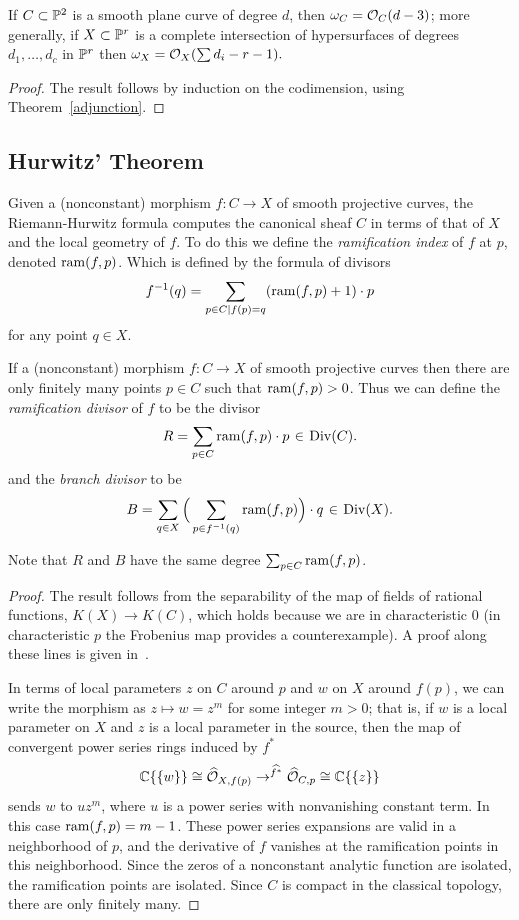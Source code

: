 \begin{corollary}\label{canonical of plane curve}
If $C\subset {\mathbb P}^{2}$ is a smooth plane curve of degree $d$, then $\omega_{C} = {\mathcal O}_{C}(d-3)$; more generally, if
$X\subset {\mathbb P}^{r}$ is a complete intersection of hypersurfaces of degrees $d_{1},\dots, d_{c}$ in ${\mathbb P}^r$ then
$\omega_{X} = {\mathcal O}_{X}(\sum d_{i }-r-1).$
\end{corollary}

\begin{proof}
The result follows by induction on the codimension, using Theorem~\ref{adjunction}.
\end{proof}

\subsection{Hurwitz' Theorem}
 Given a (nonconstant) morphism $f : C \to X$ of smooth projective curves, the Riemann-Hurwitz formula computes the canonical sheaf  $C$ in terms of that of  $X$ and the local geometry of $f$. To do this we define the
\emph{ramification index} of $f$ at $p$,  denoted $\operatorname{ram}(f,p)$. 
Which is defined 
by the formula of divisors
$$
 f^{-1}(q) = \sum_{p\in C \mid f(p)=q} (\operatorname{ram}(f,p)+1)\cdot p
 $$
 for any point $q \in X$.

\begin{proposition}
If a (nonconstant) morphism $f : C \to X$ of smooth projective curves then there are only finitely many
points $p\in C$ such that $\operatorname{ram}(f,p)>0$.
Thus we can define the \emph{ramification divisor} of $f$ to be the divisor
 $$
 R = \sum_{p \in C} \ram(f,p)\cdot p \; \in \;  \Div(C).
 $$
 and the \emph{branch divisor} to be
 $$
 B = \sum_{q \in X} \Big(\sum_{p \in f^{-1}(q)} \ram(f,p) \Big)\cdot q \; \in \; \Div(X).
 $$
\end{proposition}

Note that $R$ and $B$ have the same degree $\sum_{p \in C} \operatorname{ram}(f,p)$.

\begin{proof}
The result follows from the separability of the map of fields of rational functions, $K(X) \to K(C)$, which holds because we
are in characteristic 0 (in characteristic $p$ the Frobenius map provides a counterexample). A proof along these lines
is given in~\cite[Section IV.2]{Hartshorne1977}.

In terms of local parameters $z$ on $C$ around $p$ and $w$ on $X$ around $f(p)$, we can write the morphism as $z \mapsto w = z^m$ for some integer $m > 0$; that is,
if $w$ is a local parameter on $X$ and $z$ is a local parameter in the source, then
the map of convergent power series rings induced by $f^*$
$$
 {\mathbb C}\{\{w\}\} \cong \widehat{{\mathcal O}}_{X,f(p)} \to^{\widehat {f^*}}\widehat{{\mathcal O}}_{C,p}\cong  {\mathbb C}\{\{z\}\} 
$$
sends $w$ to $uz^m$, where $u$ is a power series with nonvanishing constant term.
In this case $\operatorname{ram}(f,p) = m-1$. These power series expansions are valid in a neighborhood
of $p$, and the derivative of $f$ vanishes at the ramification points in this neighborhood. Since
the zeros of a nonconstant analytic function are isolated, the ramification points are isolated. 
Since $C$ is compact in the classical topology, there are only finitely many.
\end{proof}

